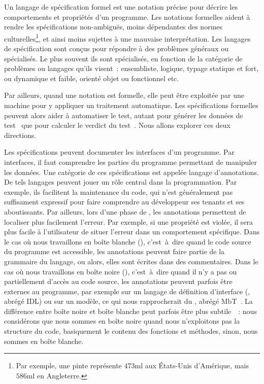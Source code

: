 Un {\strong langage de spécification} formel est une notation précise pour
décrire les comportements et propriétés d'un programme. Les {\strong notations
formelles} aident à rendre les spécifications non-ambiguës, moins dépendantes
des normes culturelles\footnote{Par exemple, une pinte représente $473$ml aux
États-Unis d'Amérique, mais $586$ml en Angleterre.}, et ainsi moins sujettes à
une mauvaise interprétation. Les langages de spécification sont conçus pour
répondre à des problèmes généraux ou spécialisés. Le plus souvent ils sont
spécialisés, en fonction de la catégorie de problèmes ou langages qu'ils
visent~: ensembliste, logique, typage statique et fort, ou dynamique et faible,
orienté objet ou fonctionnel etc.

Par ailleurs, quand une notation est formelle, elle peut être exploitée par une
machine pour y appliquer un traitement automatique. Les spécifications formelles
peuvent alors aider à {\strong automatiser le test}, autant pour générer les
données de test~ que pour
calculer le verdict du test~. Nous allons explorer ces deux
directions.

Les spécifications peuvent documenter les {\strong interfaces} d'un programme.
Par interfaces, il faut comprendre les parties du programme permettant de
manipuler les données. Une catégorie de ces spécifications est appelée {\strong
langage d'annotations}. De tels langages peuvent jouer un rôle central dans la
programmation. Par exemple, ils facilitent la maintenance du code, qui n'est
généralement pas suffisament expressif pour faire comprendre au développeur ses
tenants et ses aboutissants. Par ailleurs, lors d'une phase de
, les annotations permettent de localiser plus facilement
l'erreur. Par exemple, si une propriété est violée, il sera plus facile à
l'utilisateur de situer l'erreur dans un comportement spécifique. Dans le cas où
nous travaillons en {\strong boîte blanche} (),
c'est~à~dire quand le code source du programme est accessible, les annotations
peuvent faire partie de la grammaire du langage, ou alors, elles sont écrites
dans des commentaires. Dans le cas où nous travaillons en {\strong boîte noire}
(), c'est~à~dire quand il n'y a pas ou partiellement
d'accès au code source, les annotations peuvent parfois être externes au
programme, par exemple sur un langage de définition d'interface
(, abrégé IDL) ou sur un modèle, ce qui
nous rapprocherait du , abrégé
MbT~. La différence entre boîte noire et boîte blanche peut
parfois être plus subtile~~: nous considérons que nous sommes en
boîte noire quand nous n'exploitons pas la structure du code, basiquement le
contenu des fonctions et méthodes, sinon, nous sommes en boîte blanche.

